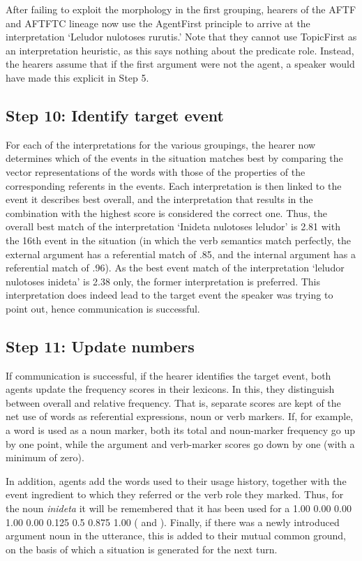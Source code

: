 \documentclass[output=paper]{LSP/langsci}
\begin{document}
After failing to exploit the morphology in the first grouping, hearers of the AFTF and AFTFTC lineage now use the AgentFirst principle to arrive at the interpretation `Leludor nulotoses rurutis.' Note that they cannot use TopicFirst as an interpretation heuristic, as this says nothing about the predicate role. Instead, the hearers assume that if the first argument were not the agent, a speaker would have made this explicit in Step 5. 

\subsection{Step 10: Identify target event}\label{17-le-sec:Identify-Target-Event}
For each of the interpretations for the various groupings, the hearer now determines which of the events in the situation matches best by comparing the vector representations of the words with those of the properties of the corresponding referents in the events. Each interpretation is then linked to the event it describes best overall, and the interpretation that results in the combination with the highest score is considered the correct one. Thus, the overall best match of the interpretation `Inideta nulotoses leludor' is 2.81 with the 16th event in the situation (in which the verb semantics match perfectly, the external argument has a referential match of .85, and the internal argument has a referential match of .96). As the best event match of the interpretation `leludor nulotoses inideta' is 2.38 only, the former interpretation is preferred. This interpretation does indeed lead to the target event the speaker was trying to point out, hence communication is successful. 


\subsection{Step 11: Update numbers}\label{17-le-sec:Update-Numbers}
If communication is successful, \ie if the hearer identifies the target event, both agents update the frequency scores in their lexicons. In this, they distinguish between overall and relative frequency. That is, separate scores are kept of the net use of words as referential expressions, noun or verb markers. If, for example, a word is used as a noun marker, both its total and noun-marker frequency go up by one point, while the argument and verb-marker scores go down by one (with a minimum of zero). 

In addition, agents add the words used to their usage history, together with the event ingredient to which they referred or the verb role they marked. Thus, for the noun \textit{inideta} it will be remembered that it has been used for a 1.00 0.00 0.00 1.00 0.00 0.125 0.5 0.875 1.00 (\cf {} and ). Finally, if there was a newly introduced argument noun in the utterance, this is added to their mutual common ground, on the basis of which a situation is generated for the next turn.
\end{document}
